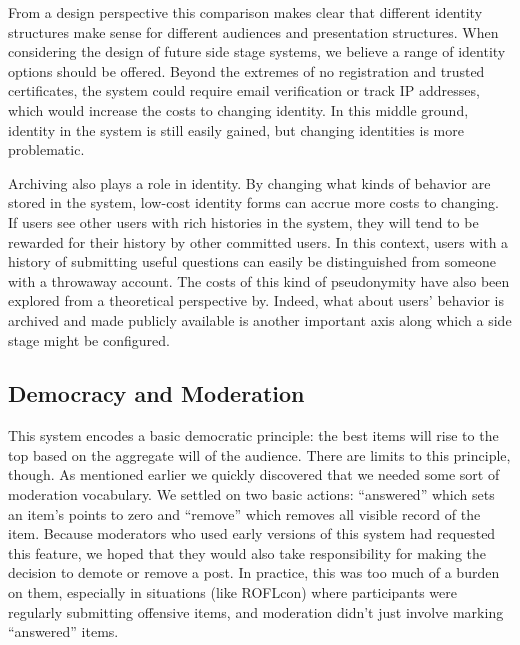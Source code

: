 From a design perspective this comparison makes clear that different identity structures make sense for different audiences and presentation structures. When considering the design of future side stage systems, we believe a range of identity options should be offered. Beyond the extremes of no registration and trusted certificates, the system could require email verification or track IP addresses, which would increase the costs to changing identity. In this middle ground, identity in the system is still easily gained, but changing identities is more problematic.

Archiving also plays a role in identity. By changing what kinds of behavior are stored in the system, low-cost identity forms can accrue more costs to changing. If users see other users with rich histories in the system, they will tend to be rewarded for their history by other committed users. \citep{Resnick:2002hf} In this context, users with a history of submitting useful questions can easily be distinguished from someone with a throwaway account. The costs of this kind of pseudonymity have also been explored from a theoretical perspective by\citep{Friedman:2001ti}. Indeed, what about users' behavior is archived and made publicly available is another important axis along which a side stage might be configured.

\subsection{Democracy and Moderation}
This system encodes a basic democratic principle: the best items will rise to the top based on the aggregate will of the audience. There are limits to this principle, though. As mentioned earlier we quickly discovered that we needed some sort of moderation vocabulary. We settled on two basic actions: ``answered'' which sets an item's points to zero and ``remove'' which removes all visible record of the item. Because moderators who used early versions of this system had requested this feature, we hoped that they would also take responsibility for making the decision to demote or remove a post. In practice, this was too much of a burden on them, especially in situations (like ROFLcon) where participants were regularly submitting offensive items, and moderation didn't just involve marking ``answered'' items. 

